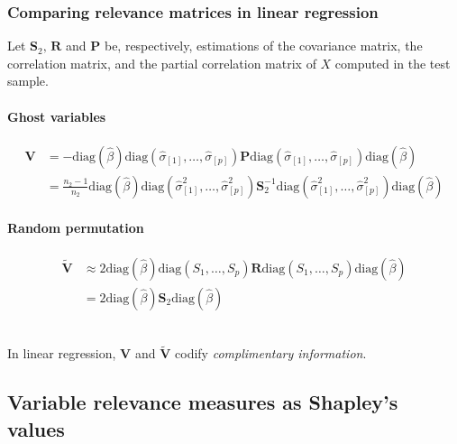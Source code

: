 \subsubsection{Comparing relevance matrices in linear regression}

Let $\boldsymbol S_2,\, \boldsymbol R$ and $\boldsymbol P$ be, respectively,
estimations of the covariance matrix, the correlation matrix, and the partial correlation matrix of
$X$ computed in the test sample.

\paragraph{Ghost variables}

\begin{align*}
	\boldsymbol V & = - \text{diag}\left(\hat\beta\right) \text{diag}\left(\hat\sigma_{[1]},\ldots,\hat\sigma_{[p]}\right)
	\boldsymbol P\text{diag}\left(\hat\sigma_{[1]},\ldots,\hat\sigma_{[p]}\right) \text{diag}\left(\hat\beta\right)        \\
	              & = \frac{n_2 - 1}{n_2}
	\text{diag}\left(\hat\beta\right) \text{diag}\left(\hat\sigma_{[1]}^2,\ldots,\hat\sigma_{[p]}^2\right)
	\boldsymbol S_2^{-1} \text{diag}\left(\hat\sigma_{[1]}^2,\ldots,\hat\sigma_{[p]}^2\right) \text{diag}\left(\hat\beta\right)
\end{align*}

\paragraph{Random permutation}

\begin{align*}
	\tilde{\boldsymbol V} & \approx
	2\text{diag}\left(\hat\beta\right) \text{diag}\left(S_1,\ldots,S_p\right) \boldsymbol R \text{diag}\left(S_1,\ldots,S_p\right) \text{diag}\left(\hat\beta\right) \\
	                      & = 2 \text{diag}\left(\hat\beta\right) \boldsymbol S_2 \text{diag}\left(\hat\beta\right)
\end{align*}

\begin{align*}
\end{align*}

\begin{note}
	In linear regression, $\boldsymbol V$ and $\tilde{\boldsymbol{V}}$ codify
	\emph{complimentary information}.
\end{note}


\subsection{Variable relevance measures as Shapley’s values}

